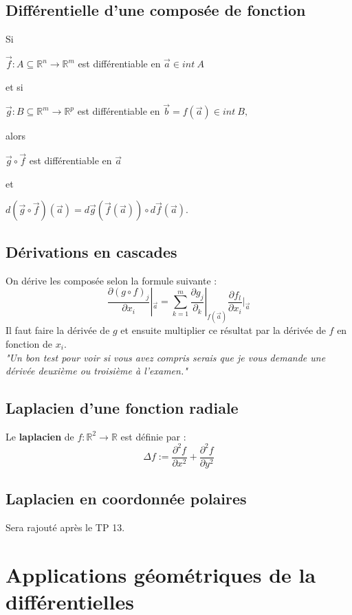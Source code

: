 \documentclass	[11pt, a4paper, openany]{book}
\begin{document}
\subsection{Différentielle d'une composée de fonction}
Si
\begin{center}
$\vec{f} : A \subseteq \mathbb{R}^n \rightarrow \mathbb{R}^m$ est différentiable en $\vec{a} \in int\ A$
\end{center}
et si
\begin{center}
$\vec{g} : B \subseteq \mathbb{R}^m \rightarrow \mathbb{R}^p$ est différentiable en $\vec{b} = f(\vec{a}) \in int\ B,$
\end{center}
alors
\begin{center}
$\vec{g} \circ \vec{f}$ est différentiable en $\vec{a}$
\end{center}
et
\begin{center}
$d(\vec{g} \circ \vec{f})(\vec{a}) = d\vec{g} (\vec{f}(\vec{a})) \circ d\vec{f}(\vec{a}).$
\end{center}


\subsection{Dérivations en cascades}
On dérive les composée selon la formule suivante :
$$\frac{\partial(g \circ f)_j}{\partial x_i}|_{\vec{a}} = \sum_{k=1}^m \frac{\partial g_j}{\partial _k}|_{f(\vec{a})} \frac{\partial f_l}{\partial x_i}|_{\vec{a}}$$
Il faut faire la dérivée de $g$ et ensuite multiplier ce résultat par la dérivée de $f$ en fonction de $x_i$. \\
\textit{"Un bon test pour voir si vous avez compris serais que je vous demande une dérivée deuxième ou troisième à l'examen."}

\subsection{Laplacien d'une fonction radiale}
Le \textbf{laplacien} de $f : \mathbb{R}^2 \rightarrow \mathbb{R}$ est définie par :
$$\Delta f := \frac{\partial^2f}{\partial x^2} + \frac{\partial^2f}{\partial y^2}$$

\subsection{Laplacien en coordonnée polaires}
Sera rajouté après le TP 13.

\section{Applications géométriques de la différentielles}
\end{document}
